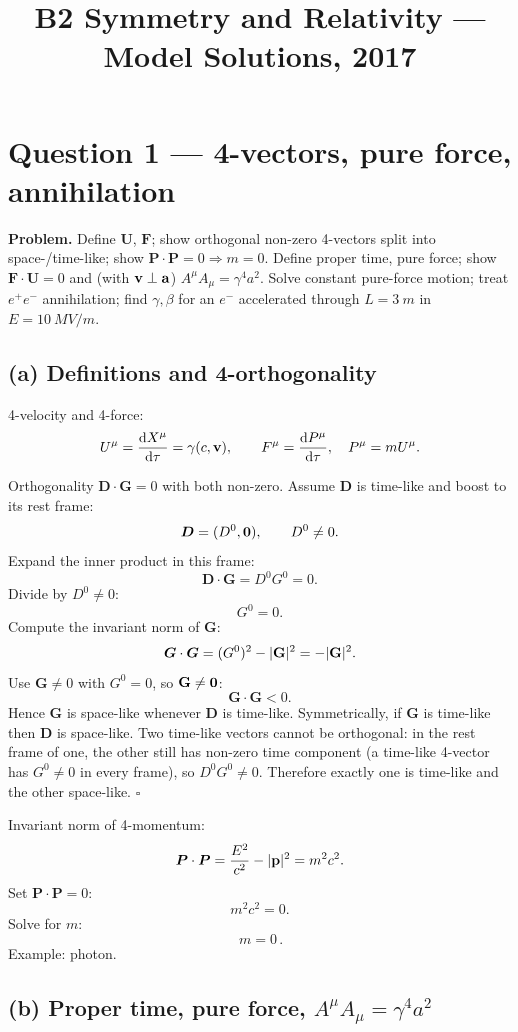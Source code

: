 \documentclass[11pt]{article}
\title{B2 Symmetry and Relativity --- Model Solutions, 2017}
\author{}
\date{}
\begin{document}
\maketitle

\section*{Question 1 --- 4-vectors, pure force, annihilation}

\textbf{Problem.} Define $\bm U$, $\bm F$; show orthogonal non-zero 4-vectors split into space-/time-like; show $\bm P\cdot\bm P=0\Rightarrow m=0$. Define proper time, pure force; show $\bm F\cdot\bm U=0$ and (with $\vb v\perp\vb a$) $A^\mu A_\mu=\gamma^4 a^2$. Solve constant pure-force motion; treat $e^+e^-$ annihilation; find $\gamma,\beta$ for an $e^-$ accelerated through $L=\SI{3}{m}$ in $E=\SI{10}{MV/m}$.

\subsection*{(a) Definitions and 4-orthogonality}

4-velocity and 4-force:
\[
U^\mu = \dv{X^\mu}{\tau} = \gamma(c,\vb v),\qquad F^\mu = \dv{P^\mu}{\tau},\quad P^\mu = m U^\mu.
\]

Orthogonality $\bm D\cdot\bm G=0$ with both non-zero. Assume $\bm D$ is time-like and boost to its rest frame:
\[
\bm D = (D^0,\vb 0),\qquad D^0\neq 0.
\]
Expand the inner product in this frame:
\[
\bm D\cdot\bm G = D^0 G^0 = 0.
\]
Divide by $D^0\neq 0$:
\[
G^0 = 0.
\]
Compute the invariant norm of $\bm G$:
\[
\bm G\cdot\bm G = (G^0)^2 - |\vb G|^2 = -|\vb G|^2.
\]
Use $\bm G\neq 0$ with $G^0=0$, so $\vb G\neq\vb 0$:
\[
\bm G\cdot\bm G < 0.
\]
Hence $\bm G$ is space-like whenever $\bm D$ is time-like. Symmetrically, if $\bm G$ is time-like then $\bm D$ is space-like. Two time-like vectors cannot be orthogonal: in the rest frame of one, the other still has non-zero time component (a time-like 4-vector has $G^0\neq 0$ in every frame), so $D^0 G^0\neq 0$. Therefore exactly one is time-like and the other space-like. \hfill$\square$

Invariant norm of 4-momentum:
\[
\bm P\cdot\bm P = \frac{E^2}{c^2} - |\vb p|^2 = m^2 c^2.
\]
Set $\bm P\cdot\bm P = 0$:
\[
m^2 c^2 = 0.
\]
Solve for $m$:
\[
\boxed{\,m=0\,}.
\]
Example: photon.

\subsection*{(b) Proper time, pure force, $A^\mu A_\mu=\gamma^4 a^2$}
\end{document}
